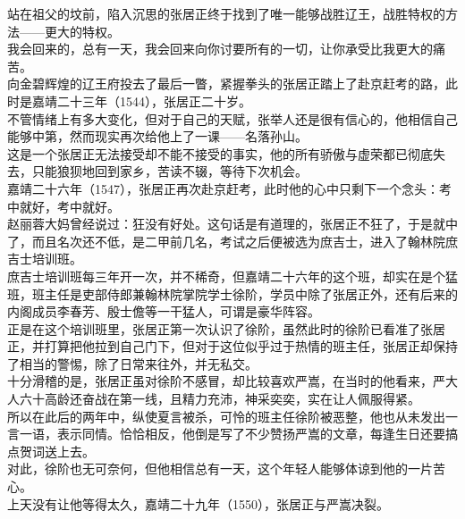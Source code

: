 \begin{multicols}{\theparacolNo}
站在祖父的坟前，陷入沉思的张居正终于找到了唯一能够战胜辽王，战胜特权的方法——更大的特权。\\

我会回来的，总有一天，我会回来向你讨要所有的一切，让你承受比我更大的痛苦。\\

向金碧辉煌的辽王府投去了最后一瞥，紧握拳头的张居正踏上了赴京赶考的路，此时是嘉靖二十三年（1544），张居正二十岁。\\

不管情绪上有多大变化，但对于自己的天赋，张举人还是很有信心的，他相信自己能够中第，然而现实再次给他上了一课——名落孙山。\\

这是一个张居正无法接受却不能不接受的事实，他的所有骄傲与虚荣都已彻底失去，只能狼狈地回到家乡，苦读不辍，等待下次机会。\\

嘉靖二十六年（1547），张居正再次赴京赶考，此时他的心中只剩下一个念头：考中就好，考中就好。\\

赵丽蓉大妈曾经说过：狂没有好处。这句话是有道理的，张居正不狂了，于是就中了，而且名次还不低，是二甲前几名，考试之后便被选为庶吉士，进入了翰林院庶吉士培训班。\\

庶吉士培训班每三年开一次，并不稀奇，但嘉靖二十六年的这个班，却实在是个猛班，班主任是吏部侍郎兼翰林院掌院学士徐阶，学员中除了张居正外，还有后来的内阁成员李春芳、殷士儋等一干猛人，可谓是豪华阵容。\\

正是在这个培训班里，张居正第一次认识了徐阶，虽然此时的徐阶已看准了张居正，并打算把他拉到自己门下，但对于这位似乎过于热情的班主任，张居正却保持了相当的警惕，除了日常来往外，并无私交。\\

十分滑稽的是，张居正虽对徐阶不感冒，却比较喜欢严嵩，在当时的他看来，严大人六十高龄还奋战在第一线，且精力充沛，神采奕奕，实在让人佩服得紧。\\

所以在此后的两年中，纵使夏言被杀，可怜的班主任徐阶被恶整，他也从未发出一言一语，表示同情。恰恰相反，他倒是写了不少赞扬严嵩的文章，每逢生日还要搞点贺词送上去。\\

对此，徐阶也无可奈何，但他相信总有一天，这个年轻人能够体谅到他的一片苦心。\\

上天没有让他等得太久，嘉靖二十九年（1550），张居正与严嵩决裂。\\


\end{multicols}

